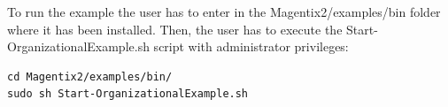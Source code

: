 To run the example the user has to enter in the Magentix2/examples/bin folder where it has been installed. Then,
the user has to execute the Start-OrganizationalExample.sh script with administrator privileges:

\begin{lstlisting}
cd Magentix2/examples/bin/
sudo sh Start-OrganizationalExample.sh
\end{lstlisting}
